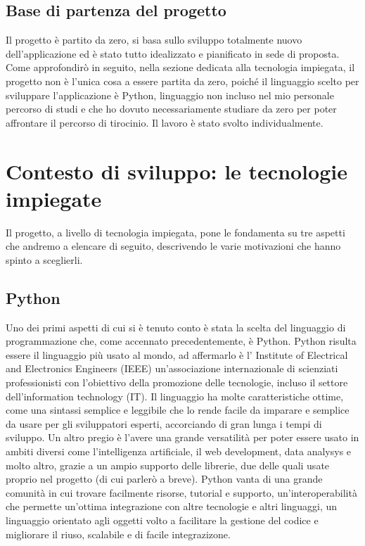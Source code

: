 \documentclass[binding=0.6cm]{sapthesis}
\begin{document}
\section{Base di partenza del progetto}
Il progetto è partito da zero, si basa sullo sviluppo totalmente nuovo dell'applicazione ed è stato tutto idealizzato e pianificato in sede di proposta.
Come approfondirò in seguito, nella sezione dedicata alla tecnologia impiegata, il progetto non è l'unica cosa a essere partita da zero, poiché il linguaggio
scelto per sviluppare l'applicazione è Python\cite{PythonWebsite}, linguaggio non incluso nel mio 
personale percorso di studi e che ho dovuto necessariamente studiare da zero per poter affrontare il percorso di tirocinio.
Il lavoro è stato svolto individualmente.

\chapter{Contesto di sviluppo: le tecnologie impiegate}
Il progetto, a livello di tecnologia impiegata, pone le fondamenta su tre aspetti che andremo a 
elencare di seguito, descrivendo le varie motivazioni che hanno spinto a sceglierli. 
\section{Python}
Uno dei primi aspetti di cui si è tenuto conto è stata
la scelta del linguaggio di programmazione che, come accennato precedentemente, è Python. 
Python risulta essere il linguaggio più
usato al mondo, ad affermarlo è l' Institute of Electrical and Electronics Engineers (IEEE)\cite{IEEEwebsite}\cite{IEEESpectrumArticle2023} 
un'associazione internazionale di scienziati professionisti con l'obiettivo della promozione delle tecnologie, incluso il settore dell'information technology (IT). 
Il linguaggio ha molte caratteristiche ottime, come
una sintassi semplice e leggibile che lo rende facile da imparare e semplice da usare per gli sviluppatori esperti, accorciando di gran lunga i tempi di sviluppo.
Un altro pregio è l'avere una grande versatilità per poter essere usato in ambiti diversi come l'intelligenza artificiale, il web development, data analysys e molto altro, grazie a un ampio
supporto delle librerie, due delle quali usate proprio nel progetto (di cui parlerò a breve). 
Python vanta di una grande comunità in cui trovare facilmente risorse, 
tutorial e supporto, un'interoperabilità che permette un'ottima integrazione con altre tecnologie e altri linguaggi, un linguaggio orientato agli oggetti volto a facilitare la gestione del codice e migliorare il riuso,
scalabile e di facile integrazizone. 
\end{document}
